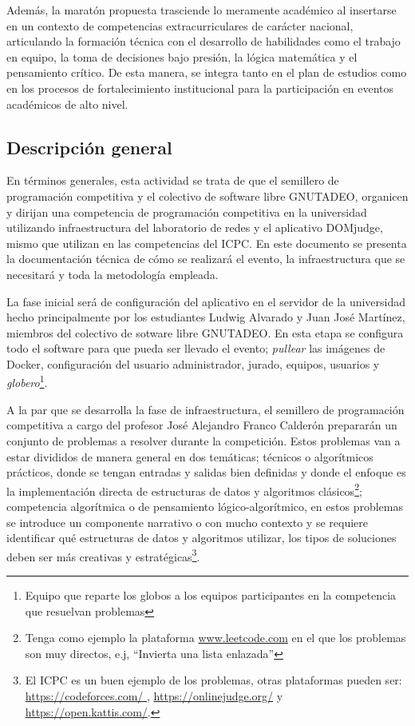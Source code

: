 \documentclass{article}
\begin{document}
Además, la maratón propuesta trasciende lo meramente académico al insertarse en un contexto de competencias extracurriculares de carácter nacional, articulando la formación técnica con el desarrollo de habilidades como el trabajo en equipo, la toma de decisiones bajo presión, la lógica matemática y el pensamiento crítico. De esta manera, se integra tanto en el plan de estudios como en los procesos de fortalecimiento institucional para la participación en eventos académicos de alto nivel.


\subsection{Descripción general}

En términos generales, esta actividad se trata de que el semillero de programación competitiva y el colectivo de software libre GNUTADEO, organicen y dirijan una competencia de programación competitiva en la universidad utilizando infraestructura del laboratorio de redes y el aplicativo DOMjudge\cite{domjudge-docs}, mismo que utilizan en las competencias del ICPC\cite{domjudge-about}. En este documento se presenta la documentación técnica de cómo se realizará el evento, la infraestructura que se necesitará y toda la metodología empleada.


La fase inicial será de configuración del aplicativo en el servidor de la universidad hecho principalmente por los estudiantes Ludwig Alvarado y Juan José Martínez, miembros del colectivo de sotware libre GNUTADEO. En esta etapa se configura todo el software para que pueda ser llevado el evento; \textit{pullear} las imágenes de Docker\cite{domjudge-judgehost,domjudge-domserver}, configuración del usuario administrador, jurado, equipos, usuarios y \textit{globero}\footnote{Equipo que reparte los globos a los equipos participantes en la competencia que resuelvan problemas}.


A la par que se desarrolla la fase de infraestructura, el semillero de programación competitiva a cargo del profesor José Alejandro Franco Calderón prepararán un conjunto de problemas a resolver durante la competición. Estos problemas van a estar divididos de manera general en dos temáticas; técnicos o algorítmicos prácticos, donde se tengan entradas y salidas bien definidas y donde el enfoque es la implementación directa de estructuras de datos y algoritmos clásicos\footnote{Tenga como ejemplo la plataforma \url{www.leetcode.com}\cite{leetcode} en el que los problemas son muy directos, e.j, ``Invierta una lista enlazada''}; competencia algorítmica o de pensamiento lógico-algorítmico, en estos problemas se introduce un componente narrativo o con mucho contexto y se requiere identificar qué estructuras de datos y algoritmos utilizar, los tipos de soluciones deben ser más creativas y estratégicas\footnote{El ICPC es un buen ejemplo de los problemas, otras plataformas pueden ser: \url{ https://codeforces.com/ }, \url{https://onlinejudge.org/} y \url{https://open.kattis.com/}. }.
\end{document}
